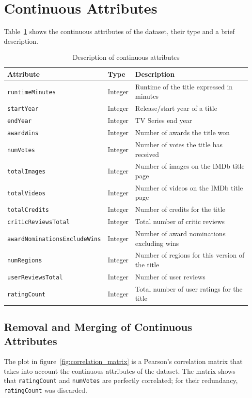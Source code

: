 \section{Continuous Attributes}
Table~\ref{tab:numerical_attributes} shows the continuous attributes of the dataset, their type and
a brief description.
\vspace{1em}
\begin{table}[H]
    \centering
    \begin{tabular}{lll}
        \toprule
        \textbf{Attribute} & \textbf{Type} & \textbf{Description} \\
        \midrule
        \texttt{runtimeMinutes} & Integer & Runtime of the title expressed in minutes \\
        \texttt{startYear} & Integer & Release/start year of a title \\
        \texttt{endYear} & Integer & TV Series end year \\
        \texttt{awardWins} & Integer & Number of awards the title won \\
        \texttt{numVotes} & Integer & Number of votes the title has received \\
        \texttt{totalImages} & Integer & Number of images on the IMDb title page \\
        \texttt{totalVideos} & Integer & Number of videos on the IMDb title page \\
        \texttt{totalCredits} & Integer & Number of credits for the title \\
        \texttt{criticReviewsTotal} & Integer & Total number of critic reviews \\
        \texttt{awardNominationsExcludeWins} & Integer & Number of award nominations excluding wins \\
        \texttt{numRegions} & Integer & Number of regions for this version of the title \\
        \texttt{userReviewsTotal} & Integer & Number of user reviews \\
        \texttt{ratingCount} & Integer & Total number of user ratings for the title \\
        \bottomrule
    \end{tabular}
    \caption{Description of continuous attributes}
    \label{tab:numerical_attributes}
\end{table}

\subsection{Removal and Merging of Continuous Attributes}\label{sec:var_elim_creation}
The plot in figure~\ref{fig:correlation_matrix} is a Pearson's correlation matrix that takes into
account the continuous attributes of the dataset.
The matrix shows that \texttt{ratingCount} and \texttt{numVotes} are perfectly correlated;
for their redundancy, \texttt{ratingCount} was discarded.\\


